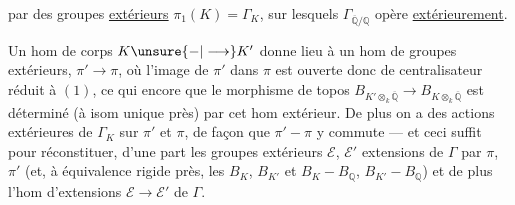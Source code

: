 par des groupes  \uline{extérieurs} $\pi_1(K)=\Gamma_K$, sur lesquels  $\Gamma_{\overline{\mathbb Q}/\mathbb Q}$ opère \uline{extérieurement}.

Un hom de corps $K\unsure{-|\longrightarrow}K'$ donne lieu à un hom de groupes extérieurs,
 $\pi'\longrightarrow\pi$, où l'image de $\pi'$ dans $\pi$ est ouverte donc de centralisateur réduit à $(1)$, ce qui  encore que le morphisme de topos $B_{K'\otimes_k\overline{\mathbb Q}}\longrightarrow B_{K\otimes_k\overline{\mathbb Q}}$ est déterminé (à isom unique près) par cet hom extérieur. De plus on a des actions extérieures de \inserted{$\Gamma=$}$\Gamma_K$ sur $\pi'$ et $\pi$, de façon que $\pi'-\pi$ y commute --- et ceci suffit pour réconstituer, d'une part les groupes extérieurs $\mathcal E$, $\mathcal E'$ extensions  de $\Gamma$ par $\pi$, $\pi'$ (et, à équivalence rigide près, les $B_K$, $B_{K'}$ et $B_K-B_{\mathbb Q}$, $B_{K'}-B_{\mathbb Q}$) et de plus l'hom d'extensions  $\mathcal E\longrightarrow\mathcal E'$ de $\Gamma$.
